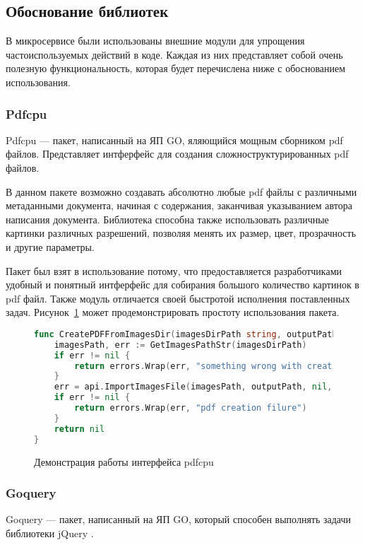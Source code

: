 \subsection{Обоснование библиотек}

В микросервисе были использованы внешние модули для упрощения частоиспользуемых действий в коде.
Каждая из них представляет собой очень полезную функциональность, которая будет перечислена ниже с обоснованием использования.

\subsubsection{Pdfcpu}
Pdfcpu \cite{pdfcpu-cite} --- пакет, написанный на ЯП GO, яляющийся мощным сборником pdf файлов. Представляет интферфейс для создания сложноструктурированных pdf файлов.

В данном пакете возможно создавать абсолютно любые pdf файлы с различными метаданными документа, начиная с содержания, заканчивая указыванием автора написания документа.
Библиотека способна также использовать различные картинки различных разрешений, позволяя менять их размер, цвет, прозрачность и другие параметры.

Пакет был взят в использование потому, что предоставляется разработчиками удобный и понятный интферфейс для собирания большого количество картинок в pdf файл. 
Также модуль отличается своей быстротой исполнения поставленных задач. Рисунок~\ref{libs-pdfcpu} может продемонстрировать простоту использования пакета.

\begin{figure}
\begin{lstlisting}[language=go]
func CreatePDFFromImagesDir(imagesDirPath string, outputPath string) error {
	imagesPath, err := GetImagesPathStr(imagesDirPath)
	if err != nil {
		return errors.Wrap(err, "something wrong with creating images path")
	}
	err = api.ImportImagesFile(imagesPath, outputPath, nil, nil)
	if err != nil {
		return errors.Wrap(err, "pdf creation filure")
	}
	return nil
}
\end{lstlisting}
\caption{Демонстрация работы интерфейса pdfcpu}
\label{libs-pdfcpu}
\end{figure}


\subsubsection{Goquery}
Goquery \cite{goquery-cite} --- пакет, написанный на ЯП GO, который способен выполнять задачи библиотеки jQuery \cite{jquery-cite}. 

